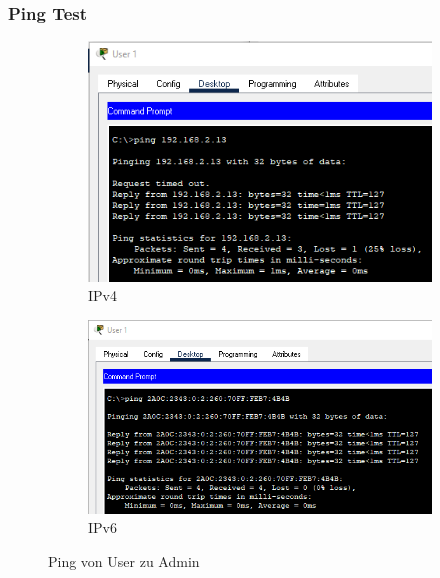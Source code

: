 \subsubsection{Ping Test}
\begin{figure}[!htb]
    \centering
    \begin{subfigure}{.8\textwidth}
        \includegraphics[width=\textwidth,height=.85\textwidth,keepaspectratio]{./img/user_ping_admin.png}
        \caption{IPv4}
    \end{subfigure}
    \begin{subfigure}{.8\textwidth}
        \includegraphics[width=\textwidth,height=.85\textwidth,keepaspectratio]{./img/ipv6_user_ping_admin.png}
        \caption{IPv6}
    \end{subfigure}
    \caption{Ping von User zu Admin}
\end{figure}
\FloatBarrier
